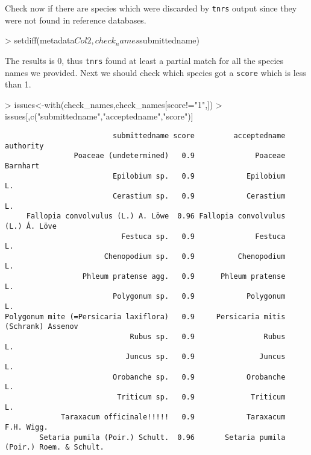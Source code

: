 \documentclass{article}
\begin{document}
\begin{Schunk}
\end{Schunk}

   Check now if there are species which were discarded by
   \texttt{tnrs} output since they were not found in reference
   databases. 
   
\begin{Schunk}
\begin{Sinput}
> setdiff(metadata$Col2,check_names$submittedname)
\end{Sinput}
\end{Schunk}

   The results is 0, thus \texttt{tnrs} found at least a partial match for all the species names we provided.
   Next we should check which species got a \texttt{score} which is less than 1.
\begin{Schunk}
\begin{Sinput}
> issues<-with(check_names,check_names[score!="1",])
> issues[,c("submittedname","acceptedname","score")]
\end{Sinput}
\end{Schunk}

\small
\begin{verbatim}
                         submittedname score         acceptedname               authority
                Poaceae (undetermined)   0.9              Poaceae                Barnhart
                         Epilobium sp.   0.9            Epilobium                      L.
                         Cerastium sp.   0.9            Cerastium                      L.
     Fallopia convolvulus (L.) A. Löwe  0.96 Fallopia convolvulus            (L.) Á. Löve
                           Festuca sp.   0.9              Festuca                      L.
                       Chenopodium sp.   0.9          Chenopodium                      L.
                  Phleum pratense agg.   0.9      Phleum pratense                      L.
                         Polygonum sp.   0.9            Polygonum                      L.
Polygonum mite (=Persicaria laxiflora)   0.9     Persicaria mitis       (Schrank) Assenov
                             Rubus sp.   0.9                Rubus                      L.
                            Juncus sp.   0.9               Juncus                      L.
                         Orobanche sp.   0.9            Orobanche                      L.
                          Triticum sp.   0.9             Triticum                      L.
             Taraxacum officinale!!!!!   0.9            Taraxacum              F.H. Wigg.
        Setaria pumila (Poir.) Schult.  0.96       Setaria pumila (Poir.) Roem. & Schult.

\end{verbatim}
\end{document}
